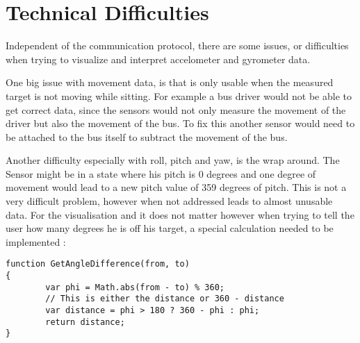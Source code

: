 \section{Technical Difficulties}

Independent of the communication protocol, there are some issues, or difficulties when trying to visualize and interpret accelometer and gyrometer data.  

One big issue with movement data, is that is only usable when the measured target is not moving while sitting. For example a bus driver would not be able to get correct data, since the sensors would not only measure the movement of the driver but also the movement of the bus. To fix this another sensor would need to be attached to the bus itself to subtract the movement of the bus. 

Another difficulty especially with roll, pitch and yaw, is the wrap around. The Sensor might be in a state where his pitch is 0 degrees and one degree of movement would lead to a new pitch value of 359 degrees of pitch. This is not a very difficult problem, however when not addressed leads to almost unusable data. 
For the visualisation and it does not matter however when trying to tell the user how many degrees he is off his target, a special calculation needed to be implemented \cite{javaHowd16:online}:

\begin{lstlisting}
function GetAngleDifference(from, to)
{
        var phi = Math.abs(from - to) % 360;
        // This is either the distance or 360 - distance
        var distance = phi > 180 ? 360 - phi : phi;
        return distance;
}
\end{lstlisting}

